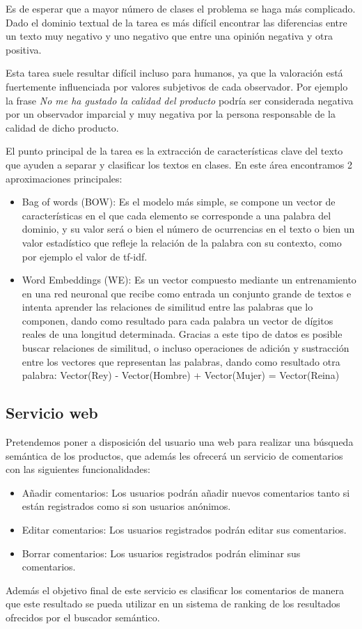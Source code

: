 Es de esperar que a mayor número de clases el problema se haga más complicado. Dado el dominio textual de la tarea es más difícil encontrar las diferencias entre un texto muy negativo y uno negativo que entre una opinión negativa y otra positiva.

Esta tarea suele resultar difícil incluso para humanos, ya que la valoración está fuertemente influenciada por valores subjetivos de cada observador. Por ejemplo la frase \emph{No me ha gustado la calidad del producto} podría ser considerada negativa por un observador imparcial y muy negativa por la persona responsable de la calidad de dicho producto.

El punto principal de la tarea es la extracción de características clave del texto que ayuden a separar y clasificar los textos en clases. En este área encontramos 2 aproximaciones principales:

\begin{itemize}
	\item Bag of words (BOW): Es el modelo más simple, se compone un vector de características en el que cada elemento se corresponde a una palabra del dominio, y su valor será o bien el número de ocurrencias en el texto o bien un valor estadístico que refleje la relación de la palabra con su contexto, como por ejemplo el valor de tf-idf.
	\item Word Embeddings (WE): Es un vector compuesto mediante un entrenamiento en una red neuronal que recibe como entrada un conjunto grande de textos e intenta aprender las relaciones de similitud entre las palabras que lo componen, dando como resultado para cada palabra un vector de dígitos reales de una longitud determinada. Gracias a este tipo de datos es posible buscar relaciones de similitud, o incluso operaciones de adición y sustracción entre los vectores que representan las palabras, dando como resultado otra palabra:
	\subitem Vector(Rey) - Vector(Hombre) + Vector(Mujer)  = Vector(Reina)
\end{itemize}


\subsection{Servicio web}
Pretendemos poner a disposición del usuario una web para realizar una búsqueda semántica de los productos, que además les ofrecerá un servicio de comentarios con las siguientes funcionalidades:

\begin{itemize}
	\item Añadir comentarios: Los usuarios podrán añadir nuevos comentarios tanto si están registrados como si son usuarios anónimos.
	\item Editar comentarios: Los usuarios registrados podrán editar sus comentarios.
	\item Borrar comentarios: Los usuarios registrados podrán eliminar sus comentarios.
\end{itemize}

Además el objetivo final de este servicio es clasificar los comentarios de manera que este resultado se pueda utilizar en un sistema de ranking de los resultados ofrecidos por el buscador semántico.

